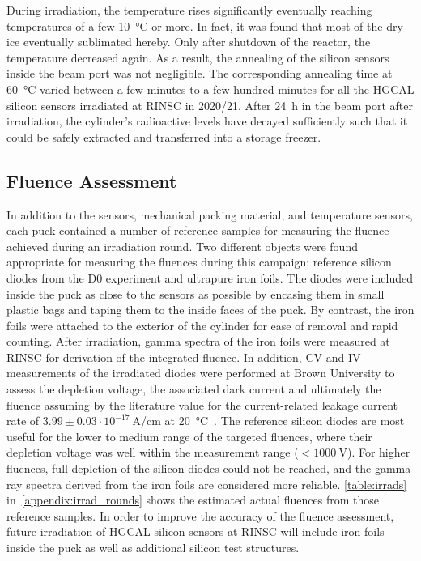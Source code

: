 During irradiation, the temperature rises significantly eventually reaching temperatures of a few \SI{+10}{\celsius} or more.
In fact, it was found that most of the dry ice eventually sublimated hereby.
Only after shutdown of the reactor, the temperature decreased again.
As a result, the annealing of the silicon sensors inside the beam port was not negligible.
The corresponding annealing time at \SI{60}{\celsius} varied between a few minutes to a few hundred minutes for all the HGCAL silicon sensors irradiated at RINSC in 2020/21.
After \SI{24}{\hour} in the beam port after irradiation, the cylinder's radioactive levels have decayed sufficiently such that it could be safely extracted and transferred into a storage freezer.

\subsection{Fluence Assessment}
In addition to the sensors, mechanical packing material, and temperature sensors, each puck contained a number of reference samples for measuring the fluence achieved during an irradiation round. 
Two different objects were found appropriate for measuring the fluences during this campaign: reference silicon diodes from the D0 experiment and ultrapure iron foils. 
The diodes were included inside the puck as close to the sensors as possible by encasing them in small plastic bags and taping them to the inside faces of the puck. 
By contrast, the iron foils were attached to the exterior of the cylinder for ease of removal and rapid counting. 
After irradiation, gamma spectra of the iron foils were measured at RINSC for derivation of the integrated fluence.
In addition, CV and IV measurements of the irradiated diodes were performed at Brown University to assess the depletion voltage, the associated dark current and ultimately the fluence assuming by the literature value for the current-related leakage current rate of $3.99\pm 0.03\cdot 10^{-17}~$A/cm at \SI{20}{\celsius}~\cite{moll:SiDamages}.
The reference silicon diodes are most useful for the lower to medium range of the targeted fluences,  where their depletion voltage was well within the measurement range ($<\SI{1000}{\volt}$).
For higher fluences, full depletion of the silicon diodes could not be reached, and the gamma ray spectra derived from the iron foils are considered more reliable.
\ref{table:irrads} in~\ref{appendix:irrad_rounds} shows the estimated actual fluences from those reference samples.
In order to improve the accuracy of the fluence assessment, future irradiation of HGCAL silicon sensors at RINSC will include iron foils inside the puck as well as additional silicon test structures.
